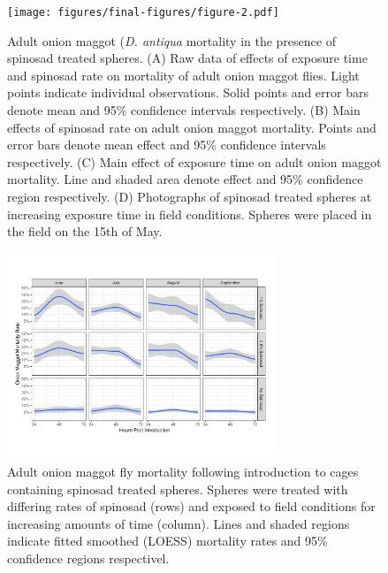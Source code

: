 \documentclass[alpha-refs]{wiley-article}
\begin{document}
\begin{figure}[bt]
\centering
\texttt{[image: figures/final-figures/figure-2.pdf]}
\caption{Adult onion maggot (\textit{D. antiqua} mortality in the presence of spinosad treated spheres.  (A) Raw data of effects of exposure time and spinosad rate on mortality of adult onion maggot flies.  Light points indicate individual observations.  Solid points and error bars denote mean and 95\% confidence intervals respectively.  (B) Main effects of spinosad rate on adult onion maggot mortality.  Points and error bars denote mean effect and 95\% confidence intervals respectively.  (C) Main effect of exposure time on adult onion maggot mortality.  Line and shaded area denote effect and 95\% confidence region respectively.  (D) Photographs of spinosad treated spheres at increasing exposure time in field conditions.  Spheres were placed in the field on the 15th of May.  }
\label{fig:figure2}
\end{figure}


\begin{figure}[bt]
\centering
\includegraphics[width = 8cm]{figures/final-figures/figure-3.pdf}
\caption{Adult onion maggot fly mortality following introduction to cages containing spinosad treated spheres.  Spheres were treated with differing rates of spinosad (rows) and exposed to field conditions for increasing amounts of time (column).  Lines and shaded regions indicate fitted smoothed (LOESS) mortality rates and 95\% confidence regions respectivel.  }
\label{fig:figure3}
\end{figure}
\end{document}
